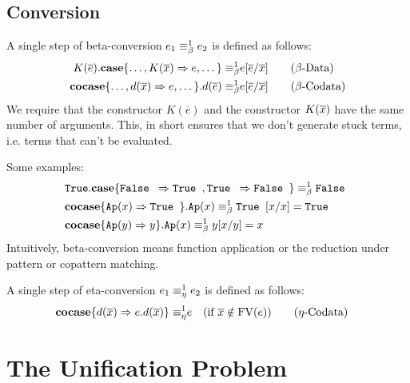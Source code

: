 \documentclass[twoside,12pt,a4paper]{article}
\begin{document}
\subsection{Conversion}


\begin{definition}
    A single step of beta-conversion $e_1 \equiv_{\beta}^1 e_2$ is defined as follows:
    \begin{align*}
        K(\overline{e}).\textbf{case}\{\dots,K(\overline{x})\Rightarrow e,\dots\} 
        \equiv_{\beta}^1 & e[\overline{e}/\overline{x}] \tag{$\beta$-Data}\\
        \textbf{cocase}\{\dots,d(\overline{x}) \Rightarrow e, \dots\}.d(\overline{e})
        \equiv_{\beta}^1 & e[\overline{e}/\overline{x}]  \tag{$\beta$-Codata}
    \end{align*}
    We require that the constructor $K(\overline{e})$ and the constructor $K(\overline{x})$ have the same number of arguments.
    This, in short ensures that we don't generate stuck terms, i.e. terms that can't be evaluated. %
\end{definition}
Some examples:
\begin{align*}
    &\texttt{True}.\textbf{case}\{\texttt{False }\Rightarrow \texttt{True }, \texttt{True } \Rightarrow \texttt{False }\}\equiv_{\beta}^1\texttt{False }\\
    &\textbf{cocase}\{\texttt{Ap}(x)\Rightarrow \texttt{True }\}.\texttt{Ap}(x)\equiv_{\beta}^1 \texttt{True }[x/x] = \texttt{True } \\
    &\textbf{cocase}\{\texttt{Ap}(y)\Rightarrow y\}.\texttt{Ap}(x) \equiv_{\beta}^1 y[x/y]= x
\end{align*}
Intuitively, beta-conversion means function application or the reduction under pattern or copattern matching. %

\begin{definition}
    A single step of eta-conversion $e_1 \equiv_{\eta}^1 e_2$ is defined as follows:
    \begin{align*}
        \textbf{cocase}\{d(\overline{x})\Rightarrow e.d(\overline{x})\} 
        \equiv_{\eta}^1 & e \quad (\text{if } \overline{x}\notin \text{FV}(e)) \tag{$\eta$-Codata}
    \end{align*}
\end{definition}


\section{The Unification Problem}
\end{document}
